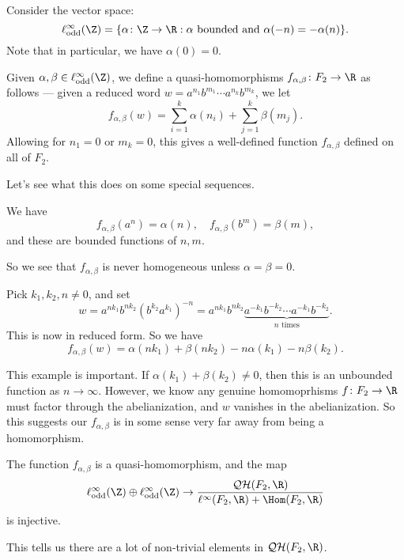 \documentclass[a4paper]{article}
\newcommand\QH{\mathcal{QH}}
\newcommand\Free{F}
\begin{document}
Consider the vector space:
\[
  \ell_{\mathrm{odd}}^\infty (\Z) = \{\alpha\colon \Z \to \R : \alpha \text{ bounded and } \alpha(-n) = -\alpha (n)\}.
\]
Note that in particular, we have $\alpha(0) = 0$.

Given $\alpha, \beta \in \ell_{\mathrm{odd}}^\infty(\Z)$, we define a quasi-homomorphisms $f_{\alpha, \beta} \colon \Free_2 \to \R$ as follows --- given a reduced word $w = a^{n_1} b^{m_1} \cdots a^{n_k}b^{m_k}$, we let
\[
  f_{\alpha, \beta}(w) = \sum_{i= 1}^k \alpha(n_i) + \sum_{j = 1}^k \beta(m_j).
\]
Allowing for $n_1 = 0$ or $m_k = 0$, this gives a well-defined function $f_{\alpha,\beta}$ defined on all of $\Free_2$.

Let's see what this does on some special sequences.
\begin{eg}
  We have
  \[
    f_{\alpha, \beta}(a^n) = \alpha(n),\quad f_{\alpha, \beta}(b^m) = \beta(m),
  \]
  and these are bounded functions of $n, m$.
\end{eg}
So we see that $f_{\alpha, \beta}$ is never homogeneous unless $\alpha = \beta = 0$.

\begin{eg}
  Pick $k_1, k_2, n \not= 0$, and set
  \[
    w = a^{nk_1} b^{nk_2} (b^{k_2}a^{k_1})^{-n} = a^{nk_1} b^{nk_2} \underbrace{a^{-k_1} b^{-k_2} \cdots a^{-k_1} b^{-k_2}}_{n\text{ times}}.
  \]
  This is now in reduced form. So we have
  \[
    f_{\alpha, \beta}(w) = \alpha(n k_1) + \beta (n k_2) - n \alpha(k_1) - n \beta(k_2).
  \]
\end{eg}
This example is important. If $\alpha(k_1) + \beta(k_2) \not= 0$, then this is an unbounded function as $n \to \infty$. However, we know any genuine homomoprhisms $f\colon \Free_2 \to \R$ must factor through the abelianization, and $w$ vanishes in the abelianization. So this suggests our $f_{\alpha, \beta}$ is in some sense very far away from being a homomorphism.

\begin{thm}[P.\ Rolli, 2009]
  The function $f_{\alpha, \beta}$ is a quasi-homomorphism, and the map
  \[
    \ell^\infty_{\mathrm{odd}} (\Z) \oplus \ell^\infty_{\mathrm{odd}}(\Z) \to \frac{\QH(\Free_2, \R)}{\ell^\infty(\Free_2, \R) + \Hom(\Free_2, \R)}
  \]
  is injective.
\end{thm}
This tells us there are a lot of non-trivial elements in $\QH(\Free_2, \R)$.
\end{document}
